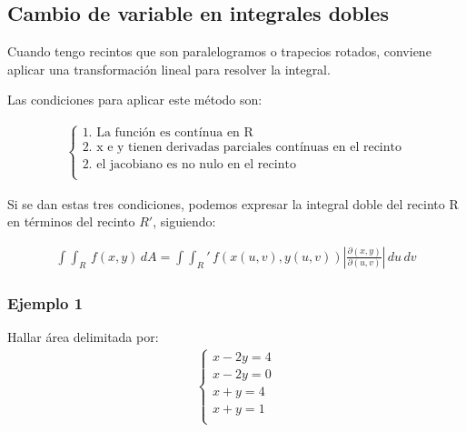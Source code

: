 \subsection{Cambio de variable en integrales dobles}

Cuando tengo recintos que son paralelogramos o trapecios rotados,
conviene aplicar una transformación lineal para resolver la integral.

Las condiciones para aplicar este método son:

\begin{align*}
    \begin{cases}
        \text{1. La función es contínua en R}                              \\
        \text{2. x e y tienen derivadas parciales contínuas en el recinto} \\
        \text{2. el jacobiano es no nulo en el recinto}                    \\
    \end{cases}
\end{align*}

Si se dan estas tres condiciones,
podemos expresar la integral doble del recinto R en términos del recinto \(R'\),
siguiendo:

\begin{align*}
    \int\int_R\,f(x,y)\,dA = \int\int_R'\,f(x(u,v),y(u,v))\left|\frac{\partial(x,y)}{\partial(u,v)}\right|\,du\,dv
\end{align*}

\subsubsection{Ejemplo 1}

Hallar área delimitada por:
\begin{align*}
    \begin{cases}
        x-2y=4 \\
        x-2y=0 \\
        x+y=4  \\
        x+y=1  \\
    \end{cases}
\end{align*}